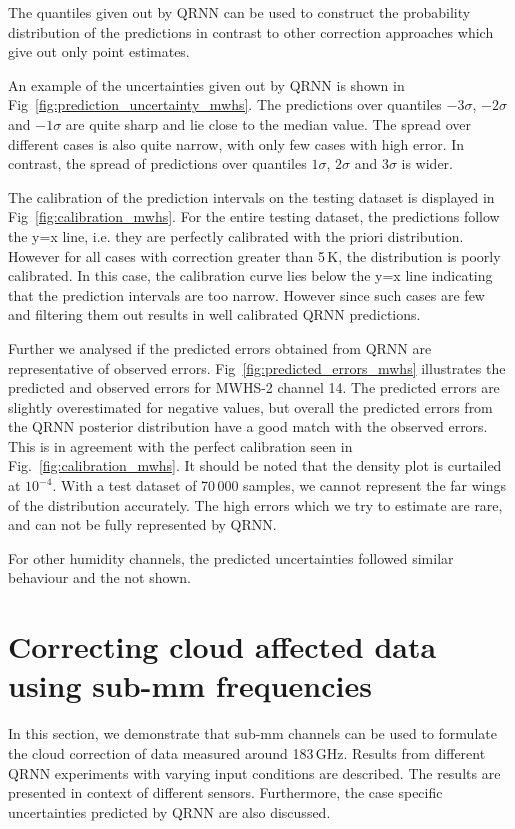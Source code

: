 \documentclass[amt]{copernicus}
\begin{document}
The quantiles given out by QRNN can be used to construct the probability distribution of the predictions in contrast to other correction approaches which give out only point estimates.  

An example of the uncertainties given out by QRNN is shown in Fig~\ref{fig:prediction_uncertainty_mwhs}. The predictions over quantiles $-3\sigma$, $-2\sigma$ and $-1\sigma$ are quite sharp and lie close to the median value. The spread over different cases is also quite narrow, with only few cases with high error. In contrast, the spread of predictions over quantiles $1\sigma$, $2\sigma$ and $3\sigma$ is wider. 

The calibration of the prediction intervals on the testing dataset is displayed in Fig~\ref{fig:calibration_mwhs}. For the entire testing dataset, the predictions follow the y=x line, i.e. they are perfectly calibrated with the priori distribution. However for all cases with correction greater than 5\,K, the distribution is poorly calibrated. In this case, the calibration curve lies below the y=x line indicating that the prediction intervals are too narrow.  However since such cases are few and filtering them out results in well calibrated QRNN predictions. 

Further we analysed if the  predicted errors obtained from QRNN are representative of observed errors. Fig~\ref{fig:predicted_errors_mwhs} illustrates the predicted and observed errors for MWHS-2 channel 14. The predicted errors are slightly overestimated for negative values, but overall the predicted errors from the QRNN posterior distribution have a good match with the observed errors. This is in agreement with the perfect calibration seen in Fig.~\ref{fig:calibration_mwhs}. It should be noted that the density plot is curtailed at $10^{-4}$. With a test dataset of 70\,000 samples, we cannot represent the far wings of the distribution accurately. The high errors which we try to estimate are rare, and can not be fully represented by QRNN. 

For other humidity channels, the predicted uncertainties followed similar behaviour and the not shown. 


\section{Correcting cloud affected data using sub-mm frequencies}
In this section, we demonstrate that sub-mm channels can be used to formulate the cloud correction of data measured around 183\,GHz. Results from different QRNN experiments with varying input conditions are described. The results are presented in context of different sensors. Furthermore, the case specific uncertainties predicted by QRNN are also discussed.
\end{document}

